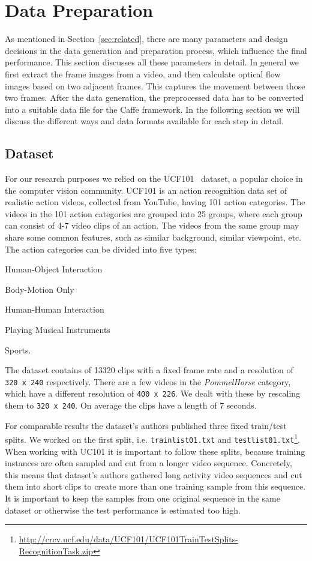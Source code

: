 \section{Data Preparation}
\label{sec:data}

As mentioned in Section~\ref{sec:related}, there are many parameters and design decisions in the data generation and preparation process, which influence the final performance.
This section discusses all these parameters in detail.
In general we first extract the frame images from a video, and then calculate optical flow images based on two adjacent frames.
This captures the movement between those two frames.
After the data generation, the preprocessed data has to be converted into a suitable data file for the Caffe framework.
In the following section we will discuss the different ways and data formats available for each step in detail.

\subsection{Dataset}
For our research purposes we relied on the UCF101~\cite{soomro2012ucf101} dataset, a popular choice in the computer vision community.
UCF101 is an action recognition data set of realistic action videos, collected from YouTube, having 101 action categories.
The videos in the 101 action categories are grouped into 25 groups, where each group can consist of 4-7 video clips of an action.
The videos from the same group may share some common features, such as similar background, similar viewpoint, etc.
The action categories can be divided into five types:
\begin{enumerate*}
	\item Human-Object Interaction
	\item Body-Motion Only
	\item Human-Human Interaction
	\item Playing Musical Instruments
	\item Sports.
\end{enumerate*}
The dataset contains of 13320 clips with a fixed frame rate and a resolution of \texttt{320 x 240} respectively.
There are a few videos in the \emph{PommelHorse} category, which have a different resolution of \texttt{400 x 226}.
We dealt with these by rescaling them to \texttt{320 x 240}.
On average the clips have a length of 7 seconds.

For comparable results the dataset's authors published three fixed train/test splits.
We worked on the first split, i.e. \texttt{trainlist01.txt} and \texttt{testlist01.txt}\footnote{ \url{http://crcv.ucf.edu/data/UCF101/UCF101TrainTestSplits-RecognitionTask.zip}}.
When working with UC101 it is important to follow these splits, because training instances are often sampled and cut from a longer video sequence.
Concretely, this means that dataset's authors gathered long activity video sequences and cut them into short clips to create more than one training sample from this sequence.
It is important to keep the samples from one original sequence in the same dataset or otherwise the test performance is estimated too high.

